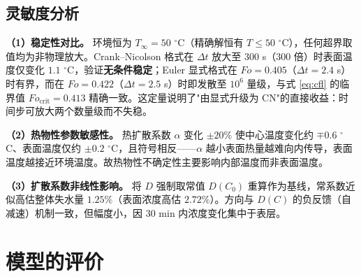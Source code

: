 \documentclass[12pt,a4paper]{ctexart}
\begin{document}
\subsection{灵敏度分析}
\textbf{（1）稳定性对比。} 环境恒为 $T_\infty=50$ $^\circ$C（精确解恒有 $T\le50$ $^\circ$C），任何超界取值均为非物理放大。Crank--Nicolson 格式在 $\Delta t$ 放大至 $300$ s（$300$ 倍）时表面温度仅变化 $1.1$ $^\circ$C，验证\textbf{无条件稳定}；Euler 显式格式在 $Fo=0.405$（$\Delta t=2.4$ s）时有界，而在 $Fo=0.422$（$\Delta t=2.5$ s）时即发散至 $10^6$ 量级，与式 \eqref{eq:cfl} 的临界值 $Fo_{\text{crit}}=0.413$ 精确一致。这定量说明了"由显式升级为 CN"的直接收益：时间步可放大两个数量级而不失稳。

\begin{table}[H]
\centering
\caption{显式与隐式格式的稳定性对比（$N=20$，$t_{\text{end}}=1800$ s）}
\label{tab:stability}
\end{table}

\textbf{（2）热物性参数敏感性。} 热扩散系数 $\alpha$ 变化 $\pm20\%$ 使中心温度变化约 $\mp0.6$ $^\circ$C、表面温度仅约 $\pm0.2$ $^\circ$C，且符号相反——$\alpha$ 越小表面热量越难向内传导，表面温度越接近环境温度。故热物性不确定性主要影响内部温度而非表面温度。

\textbf{（3）扩散系数非线性影响。} 将 $D$ 强制取常值 $D(C_0)$ 重算作为基线，常系数近似高估整体失水量 $1.25\%$（表面浓度高估 $2.72\%$）。方向与 $D(C)$ 的负反馈（自减速）机制一致，但幅度小，因 30 min 内浓度变化集中于表层。

\section{模型的评价}
\end{document}
